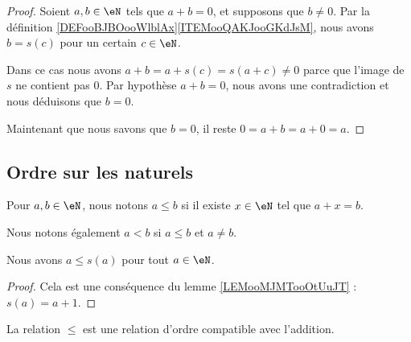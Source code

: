 \begin{proof}
    Soient \( a,b\in \eN\) tels que \( a+b=0\), et supposons que \( b\neq 0\). Par la définition \ref{DEFooBJBOooWlblAx}\ref{ITEMooQAKJooGKdJsM}, nous avons \( b=s(c)\) pour un certain \( c\in \eN\).

    Dans ce cas nous avons \( a+b=a+s(c)=s(a+c)\neq 0\) parce que l'image de \( s\) ne contient pas \( 0\). Par hypothèse \( a+b=0\), nous avons une contradiction et nous déduisons que \( b=0\).

    Maintenant que nous savons que \( b=0\), il reste \( 0=a+b=a+0=a\).
\end{proof}

\subsection{Ordre sur les naturels}

\begin{definition}     \label{DEFooAXZSooTEMjlV}
    Pour \( a,b\in \eN\), nous notons \( a\leq b\) si il existe \( x\in \eN\) tel que \( a+x=b\).

    Nous notons également \( a<b \) si \( a\leq b\) et \( a\neq b\).
\end{definition}

\begin{lemma}       \label{LEMooWMYPooLTMyWb}
    Nous avons \( a\leq s(a)\) pour tout \( a\in \eN\).
\end{lemma}

\begin{proof}
    Cela est une conséquence du lemme \ref{LEMooMJMTooOtUuJT} : \( s(a)=a+1\).
\end{proof}

\begin{proposition}     \label{PROPooVXBBooZcghrA}
    La relation \( \leq\) est une relation d'ordre compatible avec l'addition.
\end{proposition}

